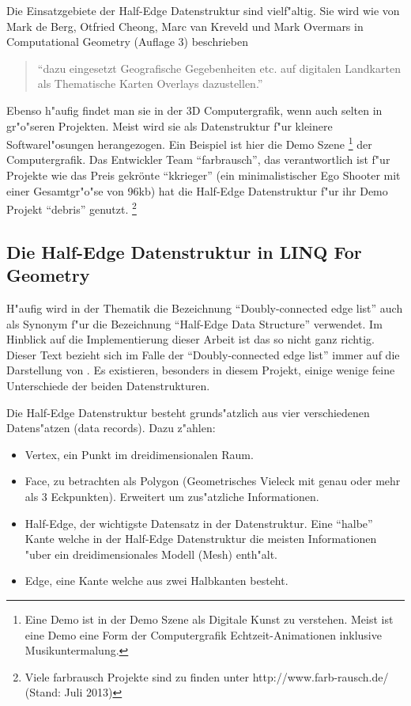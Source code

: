 \documentclass[pagesize, paper=a4, fontsize=12pt,titlepage=true, headings=small, headnosepline, abstractoff, liststotoc, nochapterprefix, plainheadsepline]{scrreprt}
\newcommand{\LFGS}{LINQ For Geometry }
\newcommand{\HES}{Half-Edge Datenstruktur }
\begin{document}
Die Einsatzgebiete der \HES sind vielf"altig. Sie wird wie von Mark de Berg, Otfried Cheong, Marc van Kreveld und Mark Overmars in Computational Geometry \cite{vanMarkdeBerg.2008} (Auflage 3) beschrieben  \begin{quote}"`dazu eingesetzt Geografische Gegebenheiten etc. auf digitalen Landkarten  als Thematische Karten Overlays dazustellen."' \cite[S.~29]{vanMarkdeBerg.2008}\end{quote} Ebenso h"aufig findet man sie in der 3D Computergrafik, wenn auch selten in gr"o"seren Projekten. Meist wird sie als Datenstruktur f"ur kleinere Softwarel"osungen herangezogen. Ein Beispiel ist hier die Demo Szene \footnote{Eine Demo ist in der Demo Szene als Digitale Kunst zu verstehen. Meist ist eine Demo eine Form der Computergrafik Echtzeit-Animationen inklusive Musikuntermalung.} der Computergrafik. Das Entwickler Team "`farbrausch"', das verantwortlich ist f"ur Projekte wie das Preis gekrönte "`kkrieger"' (ein minimalistischer Ego Shooter mit einer Gesamtgr"o"se von 96kb) hat die \HES f"ur ihr Demo Projekt "`debris"' genutzt. \footnote{Viele farbrausch Projekte sind zu finden unter http://www.farb-rausch.de/ (Stand: Juli 2013)}
		\subsection {Die Half-Edge Datenstruktur in \LFGS}
			H"aufig wird in der Thematik die Bezeichnung "`Doubly-connected edge list"' auch als Synonym f"ur die Bezeichnung "`Half-Edge Data Structure"' verwendet. Im Hinblick auf die Implementierung dieser Arbeit ist das so nicht ganz richtig. Dieser Text bezieht sich im Falle der "`Doubly-connected edge list"' immer auf die Darstellung von \cite{vanMarkdeBerg.2008}. Es existieren, besonders in diesem Projekt, einige wenige feine Unterschiede der beiden Datenstrukturen. 

Die \HES besteht grunds"atzlich aus vier verschiedenen Datens"atzen (data records). Dazu z"ahlen:
\begin{itemize}
\item Vertex, ein Punkt im dreidimensionalen Raum.
\item Face, zu betrachten als Polygon (Geometrisches Vieleck mit genau oder mehr als 3 Eckpunkten). Erweitert um zus"atzliche Informationen.
\item Half-Edge, der wichtigste Datensatz in der Datenstruktur. Eine "`halbe"' Kante welche in der \HES die meisten Informationen "uber ein dreidimensionales Modell (Mesh) enth"alt.
\item Edge, eine Kante welche aus zwei Halbkanten besteht.
\end{itemize}
\end{document}
